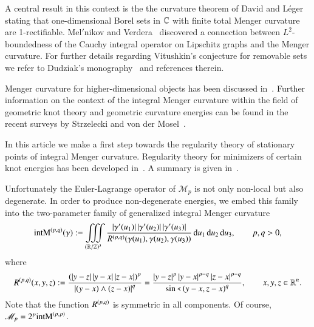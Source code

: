 A central result in this context is the
the curvature theorem of David and
L\'eger~\cite{leger} stating that one-dimensional Borel sets in $\C$
with finite total Menger curvature are 1-rectifiable.
Mel{$'$}nikov and Verdera~\cite{melnikov,melnikov-verdera,verdera}
discovered a connection between
$L^{2}$-boundedness of the Cauchy integral operator on
Lipschitz graphs and the Menger curvature.
For further details regarding
Vitushkin’s conjecture for removable sets
we refer to
Dudziak's monography~\cite{dudziak} and references therein.

Menger curvature for higher-dimensional objects has been discussed
in~\cite{kola1,kolaSM,kolaSz,Bkola,kola2,scholtes}.
Further information on the context of the integral Menger curvature
within the field of geometric knot theory and geometric curvature energies
can be found in the recent surveys by Strzelecki and von der Mosel~\cite{SM10,SM11}.

In this article we make a first step towards the
regularity theory of stationary points of {integral Menger curvature}.
Regularity theory for minimizers of certain knot energies
has been developed in~\cite{oha:fam-en,fhw,he:elghf,reiter:rkepdc,reiter:rtme,blatt-reiter2,blatt-reiter3}.
A summary is given in~\cite{blatt-reiter:proc,blatt-reiter:mbmb}.


Unfortunately
the Euler-Lagrange operator of $\mathscr M_{p}$ is not only non-local
but also degenerate.
In order to produce non-degenerate energies,
we embed this family into the two-parameter family of generalized integral Menger curvature
\begin{equation}\label{eq:intM}
 \E(\g):=\iiint\limits_{(\R/\Z)^{3}}
 \frac{\abs{\dg(u_{1})}\abs{\dg(u_{2})}\abs{\dg(u_{3})}}{\RR(\g(u_{1}),\g(u_{2}),\g(u_{3}))}
 {\d u_{1}\d u_{2}\d u_{3}}, \qquad p,q>0,
\end{equation}
where
\begin{equation}
 \RR(x,y,z) :=
 \frac{\br{\abs{y-z}\abs{y-x}\abs{z-x}}^{p}}{\abs{\br{y-x}\wedge\br{z-x}}^{q}}
 = \frac{\abs{y-z}^{p}\abs{y-x}^{p-q}\abs{z-x}^{p-q}}{\sin\angle\br{y-x,z-x}^{q}},
 \qquad x,y,z\in\R^{n}.
\end{equation}
Note that the function $\RR$ is symmetric in all components.
Of course, $\mathscr M_{p} = 2^{p}\E[p,p]$.

